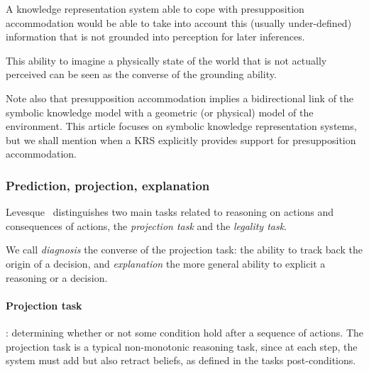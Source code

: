 \documentclass[a4paper, twocolumn]{article}
\begin{document}
A knowledge representation system able to cope with presupposition
accommodation would be able to take into account this (usually under-defined)
information that is not grounded into perception for later inferences.

This ability to imagine a physically state of the world that is not actually
perceived can be seen as the converse of the grounding ability.

Note also that presupposition accommodation implies a bidirectional link of the
symbolic knowledge model with a geometric (or physical) model of the
environment. This article focuses on symbolic knowledge representation systems,
but we shall mention when a KRS explicitly provides support for presupposition
accommodation.

\subsubsection{Prediction, projection, explanation}
\label{sect|prediction-projection}

Levesque~\cite{Levesque2008} distinguishes two main tasks related to reasoning
on actions and consequences of actions, the \emph{projection task} and the
\emph{legality task}.

We call \emph{diagnosis} the converse of the projection task: the ability to
track back the origin of a decision, and \emph{explanation} the more general
ability to explicit a reasoning or a decision.

\begin{scriptsize}
\begin{center}
\end{center}
\end{scriptsize}


\paragraph{Projection task}: determining whether or not some condition
hold after a sequence of actions. The projection task is a typical
non-monotonic reasoning task, since at each step, the system must add but also
retract beliefs, as defined in the tasks post-conditions.
\end{document}
